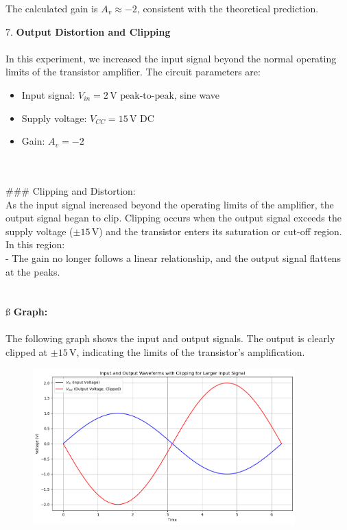 \documentclass{article}
\begin{document}
The calculated gain is \( A_v \approx -2 \), consistent with the theoretical prediction.


7. \textbf{Output Distortion and Clipping} \\ \\

In this experiment, we increased the input signal beyond the normal operating limits of the transistor amplifier. The circuit parameters are:\\ 
\begin{itemize}
    \item Input signal: \( V_{in} = 2 \, \text{V peak-to-peak} \), sine wave
    \item Supply voltage: \( V_{CC} = 15 \, \text{V DC} \)
    \item Gain: \( A_v = -2 \)
\end{itemize}
\\ \\ 
### Clipping and Distortion: \\
As the input signal increased beyond the operating limits of the amplifier, the output signal began to clip. Clipping occurs when the output signal exceeds the supply voltage (\( \pm 15 \, \text{V} \)) and the transistor enters its saturation or cut-off region. In this region:
\\
- The gain no longer follows a linear relationship, and the output signal flattens at the peaks.\\ 
\\  \\ß
\textbf{Graph:} \\ \\
The following graph shows the input and output signals. The output is clearly clipped at \( \pm 15 \, \text{V} \), indicating the limits of the transistor’s amplification.
\begin{figure}[H]
    \centering
    \includegraphics[width=0.9\textwidth]{./img/Lab5_7.png}
    \caption{}
    \label{fig:graph1} 
\end{figure}
\end{document}
